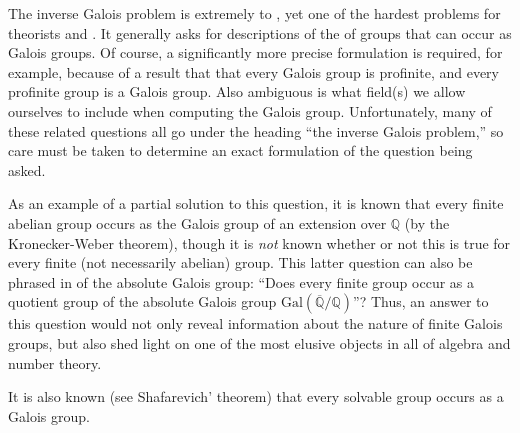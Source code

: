 \documentclass[12pt]{article}
\newcommand{\ol}{\overline}
\newcommand{\<}{\langle}
\renewcommand{\>}{\rangle}
\begin{document}
The inverse Galois problem is extremely  to , yet  one of the hardest problems for   theorists and .  It generally asks for descriptions of the  of groups that can occur as Galois groups.  Of course, a significantly more precise formulation is required, for example, because of a result that  that every Galois group is profinite, and every profinite group is a Galois group.  Also ambiguous is what field(s) we allow ourselves to include when computing the Galois group.  Unfortunately, many of these related questions all go under the heading ``the inverse Galois problem,'' so care must be taken to determine an exact formulation of the question being asked.

As an example of a partial solution to this question, it is known that every finite abelian group occurs as the Galois group of an extension over $\mathbb{Q}$ (by the Kronecker-Weber theorem), though it is \emph{not} known whether or not this is true for every finite (not necessarily abelian) group.  This latter question can also be phrased in  of the absolute Galois group:  ``Does every finite group occur as a quotient group of the absolute Galois group $\text{Gal}(\ol{\mathbb{Q}}/\mathbb{Q})$''?  Thus, an answer to this question would not only reveal information about the nature of finite Galois groups, but also shed light on one of the most elusive objects in all of algebra and number theory.

It is also known (see Shafarevich' theorem) that every solvable group occurs as a Galois group.
\end{document}
